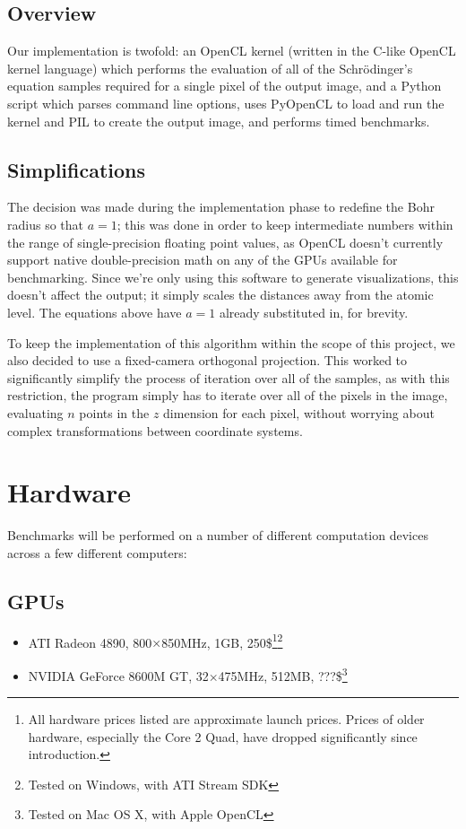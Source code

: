 \documentclass{acmsiggraph}
\begin{document}
\subsection{Overview}

Our implementation is twofold: an OpenCL kernel (written in the C-like OpenCL kernel language) which performs the evaluation of all of the Schr\"{o}dinger's equation samples required for a single pixel of the output image, and a Python script which parses command line options, uses PyOpenCL to load and run the kernel and PIL to create the output image, and performs timed benchmarks.

\subsection{Simplifications}

The decision was made during the implementation phase to redefine the Bohr radius so that $a=1$; this was done in order to keep intermediate numbers within the range of single-precision floating point values, as OpenCL doesn't currently support native double-precision math on any of the GPUs available for benchmarking. Since we're only using this software to generate visualizations, this doesn't affect the output; it simply scales the distances away from the atomic level. The equations above have $a=1$ already substituted in, for brevity.

To keep the implementation of this algorithm within the scope of this project, we also decided to use a fixed-camera orthogonal projection. This worked to significantly simplify the process of iteration over all of the samples, as with this restriction, the program simply has to iterate over all of the pixels in the image, evaluating $n$ points in the $z$ dimension for each pixel, without worrying about complex transformations between coordinate systems.

\section{Hardware}

Benchmarks will be performed on a number of different computation devices across a few different computers:

\subsection{GPUs}

\begin{itemize}

\item ATI Radeon 4890, 800$\times$850MHz, 1GB, 250\$\footnote{All hardware prices listed are approximate launch prices. Prices of older hardware, especially the Core 2 Quad, have dropped significantly since introduction.\label{fn:prices}}\footnote{Tested on Windows, with ATI Stream SDK\label{fn:windows}}

\item NVIDIA GeForce 8600M GT, 32$\times$475MHz, 512MB, ???\$\footnote{Tested on Mac OS X, with Apple OpenCL\label{fn:osx}}

\end{itemize}
\end{document}
